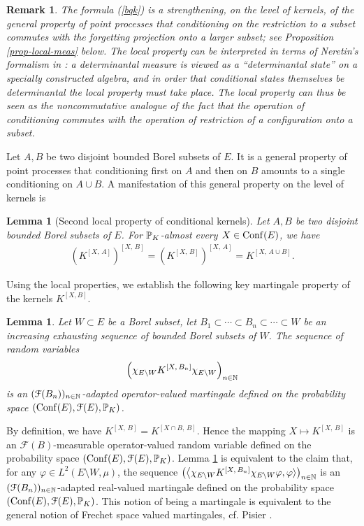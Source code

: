 \documentclass[12pt]{paper}
\newtheorem{lemma}[theorem]{Lemma}
\newtheorem*{remark*}{Remark}
\numberwithin{theorem}{section}
\numberwithin{figure}{section}
\numberwithin{equation}{section}
\begin{document}
 \begin{remark*}The formula (\ref{bqk}) is a strengthening,  on the level of kernels,  of the general property of point processes that
conditioning on the restriction to a subset commutes with the forgetting projection onto a larger subset;
see Proposition \ref{prop-local-meas} below.
 The local property  can be interpreted in terms of Neretin's formalism in \cite{neretin-fock}:
a determinantal measure is viewed as a ``determinantal state''  on a specially constructed algebra, and in order that conditional states  themselves  be determinantal the local property must take place. The local property can thus be seen as the noncommutative analogue of the fact that the operation of conditioning commutes with the operation of restriction of a configuration onto a subset.
\end{remark*}


Let $A, B$ be two disjoint bounded Borel subsets of $E$.
 It is a general property of point processes that conditioning first on $A$ and then on $B$ amounts to a  single conditioning on $A\cup B$.
A manifestation of this general property on the level of kernels is
\begin{lemma}[Second local property of conditional kernels]\label{main-local-bis}
Let $A, B$ be two disjoint bounded Borel subsets of $E$. For $\mathbb{P}_K$-almost every $X\in \mathrm{Conf}(E)$, we have
\begin{align*}
(K^{[X, \, A]})^{[X, \, B]} = (K^{[X, \, B]})^{[X, \, A]} = K^{[X, \, A\cup B]}.
\end{align*}
\end{lemma}

Using the local properties, we establish the following  key martingale property of the kernels $K^{[X,B]}$.
\begin{lemma}\label{lem-mart-prop}
Let $W\subset E$ be a Borel subset, let $B_1 \subset \cdots \subset B_n \subset \cdots \subset W$ be an increasing exhausting sequence of bounded Borel subsets of $W$. The sequence of random variables
\[
\Big( \chi_{E\setminus W}  K^{[X, \, B_n]} \chi_{E\setminus W}  \Big)_{n\in \mathbb{N}}
\]
is an $(\mathcal{F}(B_n))_{n\in\mathbb{N}}$-adapted operator-valued martingale defined on the probability space $(\mathrm{Conf}(E), \mathcal{F}(E), \mathbb{P}_K)$.
\end{lemma}

By definition, we have $K^{[X, \, B]} =  K^{[X \cap B, \, B]}$. Hence the mapping $X \mapsto K^{[X, \, B]}$ is an $\mathcal{F}(B)$-measurable operator-valued random variable defined on the probability space $(\mathrm{Conf}(E), \mathcal{F}(E), \mathbb{P}_K)$.  Lemma  \ref{lem-mart-prop} is equivalent to the claim that,  for any $\varphi \in L^2(E\setminus W, \mu)$, the sequence
$
\big(  \big\langle  \chi_{E\setminus W}  K^{[X, \, B_n]} \chi_{E\setminus W} \varphi, \varphi\rangle  \big)_{n\in \mathbb{N}}
$
is an $(\mathcal{F}(B_n))_{n\in\mathbb{N}}$-adapted real-valued martingale defined on the probability space $(\mathrm{Conf}(E), \mathcal{F}(E), \mathbb{P}_K)$.  This notion of being a martingale is equivalent to the general notion of  Frechet space valued martingales, cf. Pisier  \cite{pisier-B-martingale}.
\end{document}
